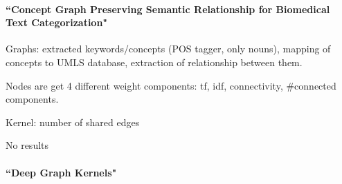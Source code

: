 
\paragraph{``Concept Graph Preserving Semantic Relationship for Biomedical Text Categorization" \cite{Gulrandhe2015}}
Graphs: extracted keywords/concepts (POS tagger, only nouns), mapping of concepts to UMLS database, extraction of relationship between them.

Nodes are get 4 different weight components: tf, idf, connectivity, #connected components.

Kernel: number of shared edges

No results

\paragraph{``Deep Graph Kernels" \cite{Yanardag2015}}
